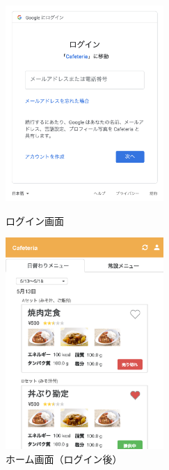 \documentclass[a4paper]{ltjsarticle}
\begin{document}
        \begin{figure}[ht]
            \begin{minipage}[t]{.49\textwidth}
                \center
                \includegraphics[width=60mm]{ui/login.png}
                \caption{ログイン画面}
                \label{img:login}
            \end{minipage}
            \begin{minipage}[t]{.49\textwidth}
                \center
                \includegraphics[width=60mm]{ui/home.png}
                \caption{ホーム画面（ログイン後）}
                \label{img:home}
            \end{minipage}
        \end{figure}
\end{document}
